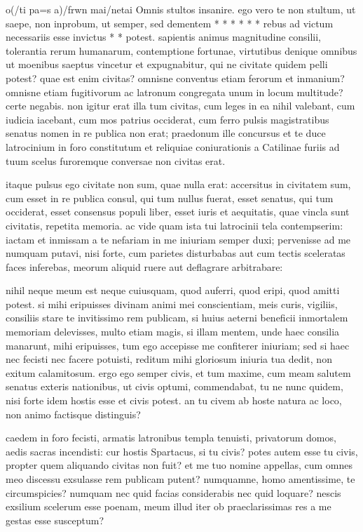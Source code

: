  o(/ti pa=s a)/frwn mai/netai Omnis stultos insanire. ego vero te non stultum, ut saepe, non inprobum, ut semper, sed dementem * * * * * * rebus ad victum necessariis esse invictus * * potest. sapientis animus magnitudine consilii, tolerantia rerum humanarum, contemptione fortunae, virtutibus denique omnibus ut moenibus saeptus vincetur et expugnabitur, qui ne civitate quidem pelli potest? quae est enim civitas? omnisne conventus etiam ferorum et inmanium? omnisne etiam fugitivorum ac latronum congregata unum in locum multitude? certe negabis. non igitur erat illa tum civitas, cum leges in ea nihil valebant, cum iudicia iacebant, cum mos patrius occiderat, cum ferro pulsis magistratibus senatus nomen in re publica non erat; praedonum ille concursus et te duce latrocinium in foro constitutum et reliquiae coniurationis a Catilinae furiis ad tuum scelus furoremque conversae non civitas erat.

 itaque pulsus ego civitate non sum, quae nulla erat: accersitus in civitatem sum, cum esset in re publica consul, qui tum nullus fuerat, esset senatus, qui tum occiderat, esset consensus populi liber, esset iuris et aequitatis, quae vincla sunt civitatis, repetita memoria. ac vide quam ista tui latrocinii tela contempserim: iactam et inmissam a te nefariam in me iniuriam semper duxi; pervenisse ad me numquam putavi, nisi forte, cum parietes disturbabas aut cum tectis sceleratas faces inferebas, meorum aliquid ruere aut deflagrare arbitrabare:

 nihil neque meum est neque cuiusquam, quod auferri, quod eripi, quod amitti potest. si mihi eripuisses divinam animi mei conscientiam, meis curis, vigiliis, consiliis stare te invitissimo rem publicam, si huius aeterni beneficii inmortalem memoriam delevisses, multo etiam magis, si illam mentem, unde haec consilia manarunt, mihi eripuisses, tum ego accepisse me confiterer iniuriam; sed si haec nec fecisti nec facere potuisti, reditum mihi gloriosum iniuria tua dedit, non exitum calamitosum. ergo ego semper civis, et tum maxime, cum meam salutem senatus exteris nationibus, ut civis optumi, commendabat, tu ne nunc quidem, nisi forte idem hostis esse et civis potest. an tu civem ab hoste natura ac loco, non animo factisque distinguis?

 caedem in foro fecisti, armatis latronibus templa tenuisti, privatorum domos, aedis sacras incendisti: cur hostis Spartacus, si tu civis? potes autem esse tu civis, propter quem aliquando civitas non fuit? et me tuo nomine appellas, cum omnes meo discessu exsulasse rem publicam putent? numquamne, homo amentissime, te circumspicies? numquam nec quid facias considerabis nec quid loquare? nescis exsilium scelerum esse poenam, meum illud iter ob praeclarissimas res a me gestas esse susceptum?

